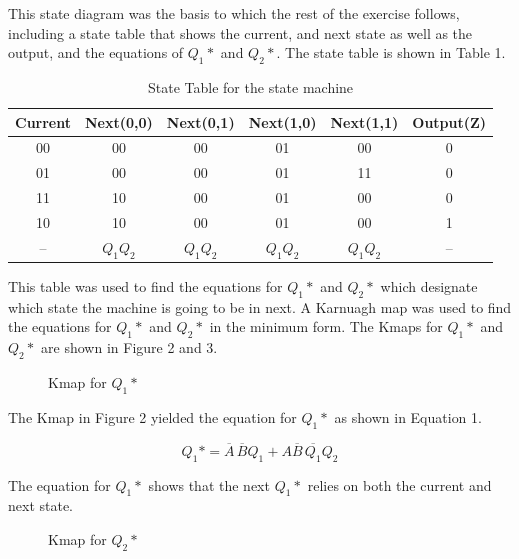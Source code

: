 \documentclass[CMPE]{KGCOEReport}
\begin{document}
This state diagram was the basis to which the rest of the exercise follows, including a state table that shows the current, and next state as well as the output, and the equations of $Q_{1}*$ and $Q_{2}*$. The state table is shown in Table 1.

\begin{table}[H]
	\centering
	\caption{State Table for the state machine}
	\label{tab:Table 1}
	\begin{tabular}{|c|c|c|c|c|c|}
		\hline
		Current & Next(0,0) & Next(0,1) & Next(1,0) & Next(1,1) & Output(Z)\\ \hline
		00 & 00 & 00 & 01 & 00 & 0\\ \hline
		01 & 00 & 00 & 01 & 11 & 0 \\ \hline
		11 & 10 & 00 & 01 & 00 & 0 \\ \hline
		10 & 10 & 00 & 01 & 00 & 1 \\ \hline
		--  & $Q_{1} Q_{2}$ & $Q_{1} Q_{2}$ & $Q_{1} Q_{2}$ & $Q_{1} Q_{2}$ & -- \\ \hline
	\end{tabular}
\end{table}

This table was used to find the equations for $Q_{1}*$ and $Q_{2}*$ which designate which state the machine is going to be in next. A Karnuagh map was used to find the equations for $Q_{1}*$ and $Q_{2}*$ in the minimum form. The Kmaps for $Q_{1}*$ and $Q_{2}*$ are shown in Figure 2 and 3.

\begin{figure}[H]
    \centering
    \begin{Karnaugh}[A][B][Q_{1}][Q_{2}]
	\end{Karnaugh}
	\caption{Kmap for $Q_{1}*$ }
	\label{fig:Figure 2}
\end{figure}

The Kmap in Figure 2 yielded the equation for $Q_{1}*$ as shown in Equation 1.

\begin{equation}
	Q_{1}* = \overline{A}\,\overline{B}Q_{1} + A\overline{B}\,\overline{Q_{1}}Q_{2}
	\label{eq:Equation 1}
\end{equation}

The equation for $Q_{1}*$ shows that the next $Q_{1}*$ relies on both the current and next state. 

\begin{figure}[H]
    \centering
    \begin{Karnaugh}[A][B][Q_{1}][Q_{2}]
	\end{Karnaugh}
	\caption{Kmap for $Q_{2}*$ }
	\label{fig:Figure 3}
\end{figure}
\end{document}

